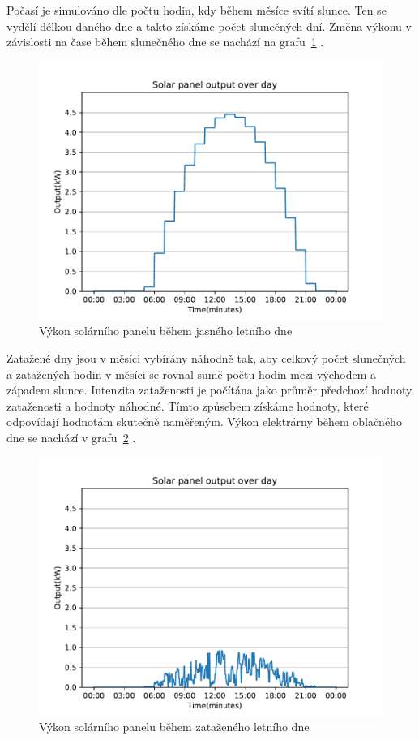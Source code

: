 \documentclass[12pt,a4paper]{article}
\begin{document}
Počasí je simulováno dle počtu hodin, kdy během měsíce svítí slunce. Ten se vydělí délkou daného dne a takto získáme počet slunečných dní. 
Změna výkonu  v závislosti na čase během slunečného dne se nachází na grafu~\ref{fig:solar_day_clear} \cite{Journal-of-PV-2020}.

\begin{figure}[H]
\begin{center}
\includegraphics[width=0.8\linewidth]{img/solar_day_clear.pdf}
\caption{Výkon solárního panelu během jasného letního dne}
\end{center}
\label{fig:solar_day_clear}
\end{figure}

Zatažené dny jsou v měsíci vybírány náhodně tak, aby celkový počet slunečných a zatažených hodin v měsíci se rovnal sumě počtu hodin mezi východem a západem slunce. Intenzita zataženosti je počítána jako průměr předchozí hodnoty zataženosti a hodnoty náhodné. Tímto způsebem získáme hodnoty, které odpovídají hodnotám skutečně naměřeným. Výkon elektrárny během oblačného dne se nachází v grafu~\ref{fig:solar_day_cloudy} \cite{Zilvar-2022}.

\begin{figure}[H]
\begin{center}
\includegraphics[width=0.8\linewidth]{img/solar_day_cloudy.pdf}
\caption{Výkon solárního panelu během zataženého letního dne}
\end{center}
\label{fig:solar_day_cloudy}
\end{figure}
\end{document}
